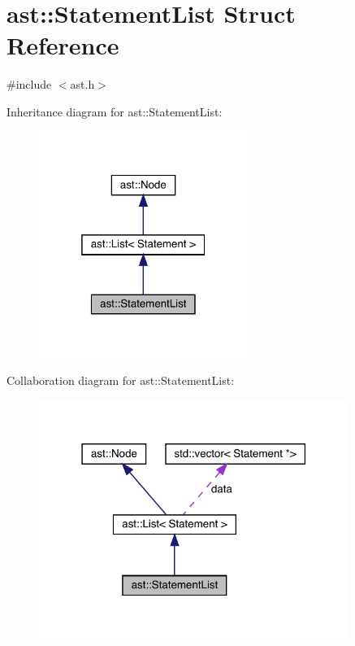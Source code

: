 \hypertarget{structast_1_1_statement_list}{}\section{ast\+:\+:Statement\+List Struct Reference}
\label{structast_1_1_statement_list}


{\ttfamily \#include $<$ast.\+h$>$}



Inheritance diagram for ast\+:\+:Statement\+List\+:\nopagebreak
\begin{figure}[H]
\begin{center}
\leavevmode
\includegraphics[width=193pt]{structast_1_1_statement_list__inherit__graph}
\end{center}
\end{figure}


Collaboration diagram for ast\+:\+:Statement\+List\+:\nopagebreak
\begin{figure}[H]
\begin{center}
\leavevmode
\includegraphics[width=286pt]{structast_1_1_statement_list__coll__graph}
\end{center}
\end{figure}
